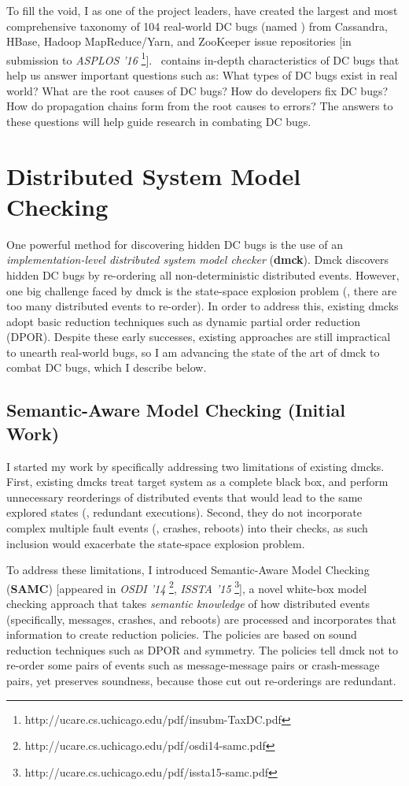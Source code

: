 \documentclass[11pt]{article}
\begin{document}
To fill the void, I as one of the project leaders, have created the largest and
most comprehensive taxonomy of 104 real-world DC bugs (named \taxdc) from
Cassandra, HBase, Hadoop MapReduce/Yarn, and ZooKeeper issue repositories [in
submission to \textit{ASPLOS
'16} \footnote{http://ucare.cs.uchicago.edu/pdf/insubm-TaxDC.pdf}]. \taxdc\
contains in-depth characteristics of DC bugs that help us answer important
questions such as: What types of DC bugs exist in real world? What are the root
causes of DC bugs?  How do developers fix DC bugs? How do propagation chains
form from the root causes to errors? The answers to these questions will help
guide research in combating DC bugs.

\section{Distributed System Model Checking}

One powerful method for discovering hidden DC bugs is the use of an
\textit{implementation-level distributed system model checker} (\textbf{dmck}).
Dmck discovers hidden DC bugs by re-ordering all non-deterministic distributed
events. However, one big challenge faced by dmck is the state-space explosion
problem (\ie, there are too many distributed events to re-order). In order to
address this, existing dmcks adopt basic reduction techniques such as dynamic
partial order reduction (DPOR). Despite these early successes, existing
approaches are still impractical to unearth real-world bugs, so I am advancing
the state of the art of dmck to combat DC bugs, which I describe below.

\subsection{Semantic-Aware Model Checking (Initial Work)} 

I started my work by specifically addressing two limitations of existing dmcks.
First, existing dmcks treat target system as a complete black box, and perform
unnecessary reorderings of distributed events that would lead to the same
explored states (\ie, redundant executions). Second, they do not incorporate
complex multiple fault events (\eg, crashes, reboots) into their checks, as such
inclusion would exacerbate the state-space explosion problem.

To address these limitations, I introduced Semantic-Aware Model Checking
(\textbf{SAMC}) [appeared in \textit{OSDI
'14} \footnote{http://ucare.cs.uchicago.edu/pdf/osdi14-samc.pdf}, \textit{ISSTA
'15} \footnote{http://ucare.cs.uchicago.edu/pdf/issta15-samc.pdf}], a novel
white-box model checking approach that takes \textit{semantic knowledge} of how
distributed events (specifically, messages, crashes, and reboots) are processed
and incorporates that information to create reduction policies. The policies are
based on sound reduction techniques such as DPOR and symmetry. The policies tell
dmck not to re-order some pairs of events such as message-message pairs or
crash-message pairs, yet preserves soundness, because those cut out re-orderings
are redundant.
\end{document}
